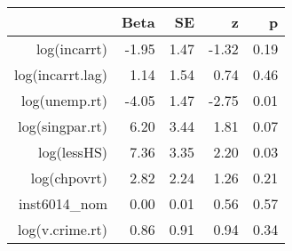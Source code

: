 \begin{table}[ht]
\centering
\begin{tabular}{rrrrr}
  \hline
 & Beta & SE & z & p \\ 
  \hline
log(incarrt) & -1.95 & 1.47 & -1.32 & 0.19 \\ 
  log(incarrt.lag) & 1.14 & 1.54 & 0.74 & 0.46 \\ 
  log(unemp.rt) & -4.05 & 1.47 & -2.75 & 0.01 \\ 
  log(singpar.rt) & 6.20 & 3.44 & 1.81 & 0.07 \\ 
  log(lessHS) & 7.36 & 3.35 & 2.20 & 0.03 \\ 
  log(chpovrt) & 2.82 & 2.24 & 1.26 & 0.21 \\ 
  inst6014\_nom & 0.00 & 0.01 & 0.56 & 0.57 \\ 
  log(v.crime.rt) & 0.86 & 0.91 & 0.94 & 0.34 \\ 
   \hline
\end{tabular}
\end{table}
